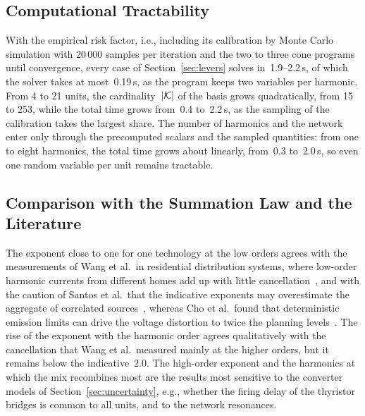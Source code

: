 \subsection{Computational Tractability}
\label{sec:tractability}

With the empirical risk factor, i.e., including its calibration by Monte Carlo simulation with 20\,000 samples per iteration and the two to three cone programs until convergence, every case of Section~\ref{sec:levers} solves in~1.9--2.2\,s, of which the solver takes at most~0.19\,s, as the program keeps two variables per harmonic. From 4 to 21 units, the cardinality~$|\mathcal{K}|$ of the basis grows quadratically, from 15 to 253, while the total time grows from~0.4 to~2.2\,s, as the sampling of the calibration takes the largest share. The number of harmonics and the network enter only through the precomputed scalars and the sampled quantities: from one to eight harmonics, the total time grows about linearly, from~0.3 to~2.0\,s, so even one random variable per unit remains tractable.

\subsection{Comparison with the Summation Law and the Literature}
\label{sec:comparison}

The exponent close to one for one technology at the low orders agrees with the measurements of Wang et al.\ in residential distribution systems, where low-order harmonic currents from different homes add up with little cancellation~\cite{wang_characteristics_2017}, and with the caution of Santos et al.\ that the indicative exponents may overestimate the aggregate of correlated sources~\cite{santos_considerations_2015}, whereas Cho et al.\ found that deterministic emission limits can drive the voltage distortion to twice the planning levels~\cite{cho_analysis_2019}. The rise of the exponent with the harmonic order agrees qualitatively with the cancellation that Wang et al.\ measured mainly at the higher orders, but it remains below the indicative~2.0. The high-order exponent and the harmonics at which the mix recombines most are the results most sensitive to the converter models of Section~\ref{sec:uncertainty}, e.g., whether the firing delay of the thyristor bridges is common to all units, and to the network resonances.
